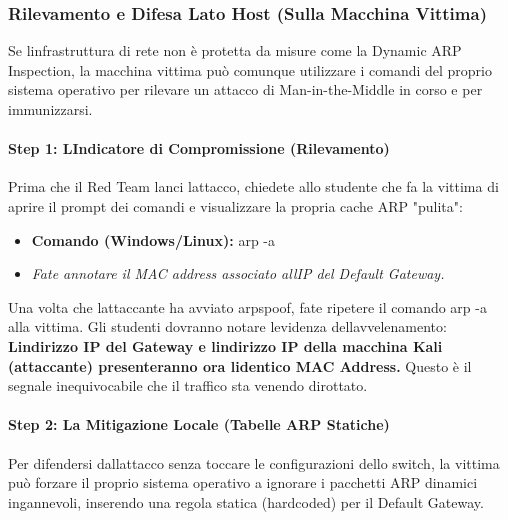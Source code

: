\documentclass[11pt,a4paper]{article}
\begin{document}
\subsubsection{Rilevamento e Difesa Lato Host (Sulla Macchina
Vittima)}\label{rilevamento-e-difesa-lato-host-sulla-macchina-vittima}

Se l\textquotesingle infrastruttura di rete non è protetta da misure
come la Dynamic ARP Inspection, la macchina vittima può comunque
utilizzare i comandi del proprio sistema operativo per rilevare un
attacco di Man-in-the-Middle in corso e per immunizzarsi.

\paragraph{Step 1: L\textquotesingle Indicatore di Compromissione
(Rilevamento)}\label{step-1-lindicatore-di-compromissione-rilevamento}

Prima che il Red Team lanci l\textquotesingle attacco, chiedete allo
studente che fa la vittima di aprire il prompt dei comandi e
visualizzare la propria cache ARP "pulita":

\begin{itemize}
\item
  \textbf{Comando (Windows/Linux):} arp -a
\item
  \emph{Fate annotare il MAC address associato all\textquotesingle IP
  del Default Gateway.}
\end{itemize}

Una volta che l\textquotesingle attaccante ha avviato arpspoof, fate
ripetere il comando arp -a alla vittima. Gli studenti dovranno notare
l\textquotesingle evidenza dell\textquotesingle avvelenamento:
\textbf{L\textquotesingle indirizzo IP del Gateway e
l\textquotesingle indirizzo IP della macchina Kali (attaccante)
presenteranno ora l\textquotesingle identico MAC Address.} Questo è il
segnale inequivocabile che il traffico sta venendo dirottato.

\paragraph{Step 2: La Mitigazione Locale (Tabelle ARP
Statiche)}\label{step-2-la-mitigazione-locale-tabelle-arp-statiche}

Per difendersi dall\textquotesingle attacco senza toccare le
configurazioni dello switch, la vittima può forzare il proprio sistema
operativo a ignorare i pacchetti ARP dinamici ingannevoli, inserendo una
regola statica (hardcoded) per il Default Gateway.
\end{document}
